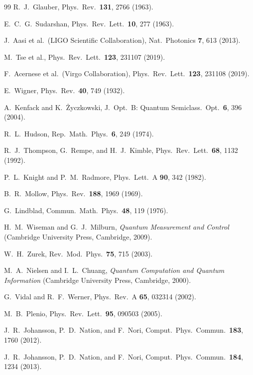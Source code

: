 \documentclass[%
 reprint,
 amsmath,amssymb,
 aps,
 floatfix,
]{revtex4-2}
\begin{document}
\begin{thebibliography}{99}
R.~J.~Glauber, Phys.\ Rev.\ \textbf{131}, 2766 (1963).

E.~C.~G.~Sudarshan, Phys.\ Rev.\ Lett.\ \textbf{10}, 277 (1963).

J.~Aasi et al.\ (LIGO Scientific Collaboration), Nat.\ Photonics \textbf{7}, 613 (2013).

M.~Tse et al., Phys.\ Rev.\ Lett.\ \textbf{123}, 231107 (2019).

F.~Acernese et al.\ (Virgo Collaboration), Phys.\ Rev.\ Lett.\ \textbf{123}, 231108 (2019).

E.~Wigner, Phys.\ Rev.\ \textbf{40}, 749 (1932).

A.~Kenfack and K.~\.{Z}yczkowski, J.~Opt.~B: Quantum Semiclass.\ Opt.\ \textbf{6}, 396 (2004).

R.~L.~Hudson, Rep.\ Math.\ Phys.\ \textbf{6}, 249 (1974).

R.~J.~Thompson, G.~Rempe, and H.~J.~Kimble, Phys.\ Rev.\ Lett.\ \textbf{68}, 1132 (1992).

P.~L.~Knight and P.~M.~Radmore, Phys.\ Lett.\ A \textbf{90}, 342 (1982).

B.~R.~Mollow, Phys.\ Rev.\ \textbf{188}, 1969 (1969).

G.~Lindblad, Commun.\ Math.\ Phys.\ \textbf{48}, 119 (1976).

H.~M.~Wiseman and G.~J.~Milburn, \textit{Quantum Measurement and Control} (Cambridge University Press, Cambridge, 2009).

W.~H.~Zurek, Rev.\ Mod.\ Phys.\ \textbf{75}, 715 (2003).

M.~A.~Nielsen and I.~L.~Chuang, \textit{Quantum Computation and Quantum Information} (Cambridge University Press, Cambridge, 2000).

G.~Vidal and R.~F.~Werner, Phys.\ Rev.\ A \textbf{65}, 032314 (2002).

M.~B.~Plenio, Phys.\ Rev.\ Lett.\ \textbf{95}, 090503 (2005).

J.~R.~Johansson, P.~D.~Nation, and F.~Nori, Comput.\ Phys.\ Commun.\ \textbf{183}, 1760 (2012).

J.~R.~Johansson, P.~D.~Nation, and F.~Nori, Comput.\ Phys.\ Commun.\ \textbf{184}, 1234 (2013).


\end{thebibliography}
\end{document}
